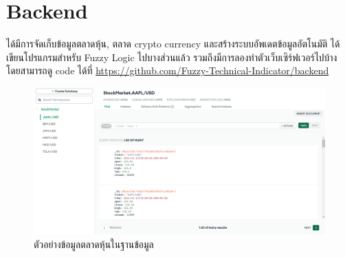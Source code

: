 \section{Backend}
ได้มีการจัดเก็บข้อมูลตลาดหุ้น, ตลาด crypto currency และสร้างระบบอัพเดตข้อมูลอัตโนมัติ ได้เขียนโปรแกรมสำหรับ Fuzzy Logic ไปบางส่วนแล้ว
รวมถึงมีการลองทำตัวเว็บเซิร์ฟเวอร์ไปบ้าง โดยสามารถดู code ได้ที่ \url{https://github.com/Fuzzy-Technical-Indicator/backend}

\begin{figure}[ht]
    \centering
    \includegraphics[width=\textwidth]{images/db_example.png}
    \caption{ตัวอย่างข้อมูลตลาดหุ้นในฐานข้อมูล}
\end{figure}
\pagebreak




